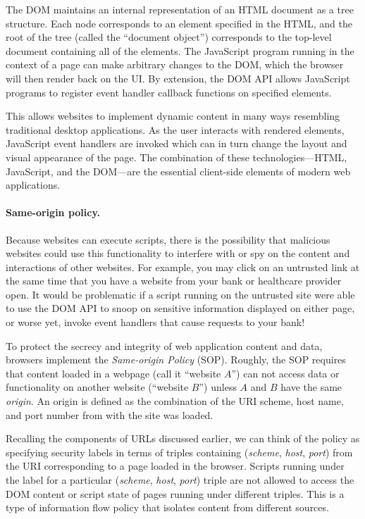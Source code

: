 \documentclass[11pt,twoside]{scrartcl}
\begin{document}
The DOM maintains an internal representation of an HTML document as a tree structure. Each node corresponds to an element specified in the HTML, and the root of the tree (called the ``document object'') corresponds to the top-level document containing all of the elements. The JavaScript program running in the context of a page can make arbitrary changes to the DOM, which the browser will then render back on the UI. By extension, the DOM API allows JavaScript programs to register event handler callback functions on specified elements. 

This allows websites to implement dynamic content in many ways resembling traditional desktop applications. As the user interacts with rendered elements, JavaScript event handlers are invoked which can in turn change the layout and visual appearance of the page. The combination of these technologies---HTML, JavaScript, and the DOM---are the essential client-side elements of modern web applications.

\paragraph{Same-origin policy.}
Because websites can execute scripts, there is the possibility that malicious websites could use this functionality to interfere with or spy on the content and interactions of other websites. For example, you may click on an untrusted link at the same time that you have a website from your bank or healthcare provider open. It would be problematic if a script running on the untrusted site were able to use the DOM API to snoop on sensitive information displayed on either page, or worse yet, invoke event handlers that cause requests to your bank!

To protect the secrecy and integrity of web application content and data, browsers implement the \emph{Same-origin Policy} (SOP). Roughly, the SOP requires that content loaded in a webpage (call it ``website $A$'') can not access data or functionality on another website (``website $B$'') unless $A$ and $B$ have the same \emph{origin}. An origin is defined as the combination of the URI scheme, host name, and port number from with the site was loaded. 

Recalling the components of URLs discussed earlier, we can think of the policy as specifying security labels in terms of triples containing (\emph{scheme}, \emph{host}, \emph{port}) from the URI corresponding to a page loaded in the browser. Scripts running under the label for a particular (\emph{scheme}, \emph{host}, \emph{port}) triple are not allowed to access the DOM content or script state of pages running under different triples. This is a type of information flow policy that isolates content from different sources.
\end{document}
